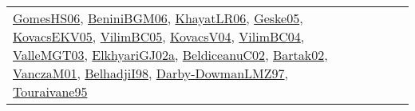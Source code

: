 {\begin{longtable}{lp{3cm}>{\raggedright}p{6cm}>{\raggedright}p{6cm}p{8cm}}
\href{papers/GomesHS06.pdf}{GomesHS06}\cite{GomesHS06}, \href{papers/BeniniBGM06.pdf}{BeniniBGM06}\cite{BeniniBGM06}, \href{articles/KhayatLR06.pdf}{KhayatLR06}\cite{KhayatLR06}, \href{papers/Geske05.pdf}{Geske05}\cite{Geske05}, \href{papers/KovacsEKV05.pdf}{KovacsEKV05}\cite{KovacsEKV05}, \href{articles/VilimBC05.pdf}{VilimBC05}\cite{VilimBC05}, \href{papers/KovacsV04.pdf}{KovacsV04}\cite{KovacsV04}, \href{papers/VilimBC04.pdf}{VilimBC04}\cite{VilimBC04}, \href{papers/ValleMGT03.pdf}{ValleMGT03}\cite{ValleMGT03}, \href{papers/ElkhyariGJ02a.pdf}{ElkhyariGJ02a}\cite{ElkhyariGJ02a}, \href{papers/BeldiceanuC02.pdf}{BeldiceanuC02}\cite{BeldiceanuC02}, \href{papers/Bartak02.pdf}{Bartak02}\cite{Bartak02}, \href{papers/VanczaM01.pdf}{VanczaM01}\cite{VanczaM01}, \href{articles/BelhadjiI98.pdf}{BelhadjiI98}\cite{BelhadjiI98}, \href{articles/Darby-DowmanLMZ97.pdf}{Darby-DowmanLMZ97}\cite{Darby-DowmanLMZ97}, \href{papers/Touraivane95.pdf}{Touraivane95}\cite{Touraivane95}\\

\end{longtable}}
